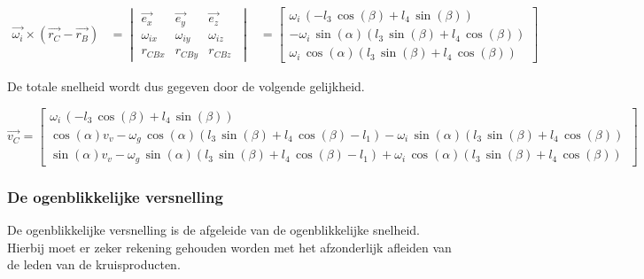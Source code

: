 \begin{equation*}
\begin{split}
\overrightarrow{\omega_{i}}\times(\overrightarrow{r_{C}}-\overrightarrow{r_{B}})
&=	\begin{vmatrix}
	\overrightarrow{e_{x}} & \overrightarrow{e_{y}} & \overrightarrow{e_{z}}\\
	\omega_{ix} & \omega_{iy} & \omega_{iz}\\
	r_{CBx} & r_{CBy} & r_{CBz}\
	\end{vmatrix}
&=	\begin{bmatrix}
	\omega_{i}\, \left( -l_{3}\,\cos \left( \beta \right) +l_{4}\,\sin \left( \beta\right)  \right) \\
	-\omega_{i}\,\sin \left( \alpha \right)  \left( l_{3}\,\sin \left( \beta \right) +l_{4}\,\cos \left( \beta \right) \right) \\
	\omega_{i}\,\cos \left( \alpha \right) \left( l_{3}\,\sin \left( \beta \right) +l_{4}\,\cos \left( \beta\right)  \right) \
	\end{bmatrix}
\end{split}
\end{equation*}

De totale snelheid wordt dus gegeven door de volgende gelijkheid.

\begin{equation*}
\overrightarrow{v_{C}}=
\begin{bmatrix}
\omega_{i}\, \left( -l_{3}\,\cos \left( \beta \right) +l_{4}\,\sin \left( \beta\right)  \right) \\

\cos \left( \alpha \right) v_{v}-\omega_{g}\,\cos\left( \alpha \right)  \left( l_{3}\,\sin \left( \beta \right) +l_{4}\,\cos \left( \beta \right) -l_{1} \right) -\omega_{i}\,\sin \left( \alpha \right)  \left( l_{3}\,\sin \left( \beta \right) +l_{4}\,\cos\left( \beta \right)  \right) \\

\sin \left( \alpha\right) v_{v}-\omega_{g}\,\sin \left( \alpha \right)  \left( l_{3}\,\sin \left( \beta \right) +l_{4}\,\cos \left( \beta \right) -l_{1}\right) +\omega_{i}\,\cos \left( \alpha \right)  \left( l_{3}\,\sin\left( \beta \right) +l_{4}\,\cos \left( \beta \right)  \right)\
\end{bmatrix}
\end{equation*}

\subsubsection{De ogenblikkelijke versnelling}
De ogenblikkelijke versnelling is de afgeleide van de ogenblikkelijke snelheid. Hierbij moet er zeker rekening gehouden worden met het afzonderlijk afleiden van de leden van de kruisproducten.


